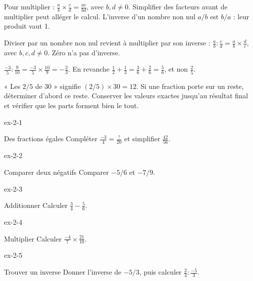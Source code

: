\begin{propriete}Pour multiplier : $\frac ab\times\frac cd=\frac{ac}{bd}$, avec $b,d\ne0$. Simplifier des facteurs avant de multiplier peut alléger le calcul. L’inverse d’un nombre non nul $a/b$ est $b/a$ : leur produit vaut 1.\end{propriete}
\begin{propriete}Diviser par un nombre non nul revient à multiplier par son inverse : $\frac ab:\frac cd=\frac ab\times\frac dc$, avec $b,c,d\ne0$. Zéro n’a pas d’inverse.\end{propriete}
\begin{exemple}$\frac{-3}{5}:\frac9{10}=\frac{-3}{5}\times\frac{10}{9}=-\frac23$. En revanche $\frac12+\frac13=\frac36+\frac26=\frac56$, et non $\frac25$.\end{exemple}
\begin{savoirfaire}« Les $2/5$ de 30 » signifie $(2/5)\times30=12$. Si une fraction porte sur un reste, déterminer d’abord ce reste. Conserver les valeurs exactes jusqu’au résultat final et vérifier que les parts forment bien le tout.\end{savoirfaire}

\clearpage{}
\begin{blocLivre}{ex-2-1}\begin{exercice}[1]{Des fractions égales}
Compléter $\frac{-3}{4}=\frac{\,?\,}{20}$ et simplifier $\frac{42}{56}$.
\end{exercice}\end{blocLivre}
\begin{blocLivre}{ex-2-2}\begin{exercice}[1]{Comparer deux négatifs}
Comparer $-5/6$ et $-7/9$.
\end{exercice}\end{blocLivre}
\begin{blocLivre}{ex-2-3}\begin{exercice}[1]{Additionner}
Calculer $\frac34-\frac56$.
\end{exercice}\end{blocLivre}
\begin{blocLivre}{ex-2-4}\begin{exercice}[1]{Multiplier}
Calculer $\frac{-4}{7}\times\frac{21}{10}$.
\end{exercice}\end{blocLivre}
\begin{blocLivre}{ex-2-5}\begin{exercice}[1]{Trouver un inverse}
Donner l’inverse de $-5/3$, puis calculer $\frac23:\frac{-5}{3}$.
\end{exercice}\end{blocLivre}

